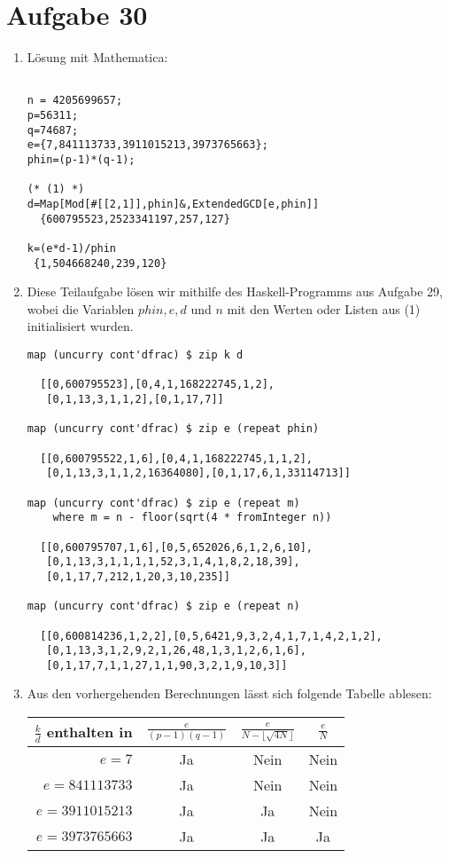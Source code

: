 \section*{Aufgabe 30}
\begin{enumerate}[(1)]
\item Lösung mit Mathematica:
\lstset{language=Mathematica}
\begin{lstlisting}

n = 4205699657;
p=56311;
q=74687;
e={7,841113733,3911015213,3973765663};
phin=(p-1)*(q-1);

(* (1) *)
d=Map[Mod[#[[2,1]],phin]&,ExtendedGCD[e,phin]]
  {600795523,2523341197,257,127}

k=(e*d-1)/phin
 {1,504668240,239,120}
\end{lstlisting}
\item
Diese Teilaufgabe lösen wir mithilfe des Haskell-Programms aus Aufgabe 29,
wobei die Variablen $phin, e, d$ und $n$ mit den Werten oder Listen aus (1)
initialisiert wurden.
\lstset{language=Haskell}
\begin{lstlisting}
map (uncurry cont'dfrac) $ zip k d

  [[0,600795523],[0,4,1,168222745,1,2],
   [0,1,13,3,1,1,2],[0,1,17,7]]

map (uncurry cont'dfrac) $ zip e (repeat phin)

  [[0,600795522,1,6],[0,4,1,168222745,1,1,2],
   [0,1,13,3,1,1,2,16364080],[0,1,17,6,1,33114713]]

map (uncurry cont'dfrac) $ zip e (repeat m)
	where m = n - floor(sqrt(4 * fromInteger n))

  [[0,600795707,1,6],[0,5,652026,6,1,2,6,10],
   [0,1,13,3,1,1,1,1,52,3,1,4,1,8,2,18,39],
   [0,1,17,7,212,1,20,3,10,235]]

map (uncurry cont'dfrac) $ zip e (repeat n)

  [[0,600814236,1,2,2],[0,5,6421,9,3,2,4,1,7,1,4,2,1,2],
   [0,1,13,3,1,2,9,2,1,26,48,1,3,1,2,6,1,6],
   [0,1,17,7,1,1,27,1,1,90,3,2,1,9,10,3]]

\end{lstlisting}
\item
Aus den vorhergehenden Berechnungen lässt sich folgende Tabelle ablesen:
\begin{center}
\begin{tabular}[]{r|c|c|c}
	$\frac{k}{d}$ enthalten in&$\frac{e}{(p-1)(q-1)}$&$\frac{e}{N-\lfloor\sqrt{4N}\rfloor}$&$\frac{e}{N}$\\
	\hline
	$e=7$&Ja&Nein&Nein\\
	\hline
	$e=841113733$&Ja&Nein&Nein\\
	\hline
	$e=3911015213$&Ja&Ja&Nein\\
	\hline
	$e=3973765663$&Ja&Ja&Ja
\end{tabular}
\end{center}
\end{enumerate}
